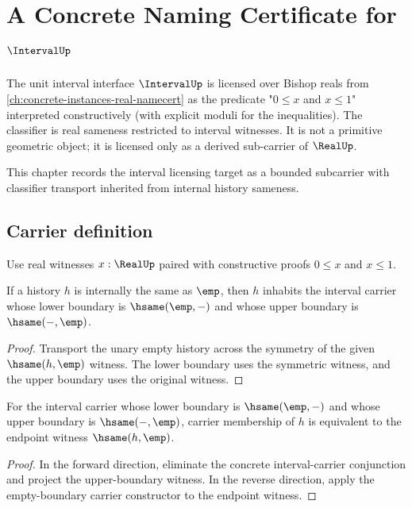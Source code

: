\chapter{A Concrete Naming Certificate for \(\IntervalUp\)}
\label{ch:concrete-instances-interval-namecert}

The unit interval interface \(\IntervalUp\) is licensed over Bishop reals from \autoref{ch:concrete-instances-real-namecert} as the predicate "\(0 \le x\) and \(x \le 1\)" interpreted constructively (with explicit moduli for the inequalities). The classifier is real sameness restricted to interval witnesses. It is not a primitive geometric object; it is licensed only as a derived sub-carrier of \(\RealUp\).

\begin{remark}
\label{rem:concrete-instances-interval-namecert-roadmap}
This chapter records the interval licensing target as a bounded subcarrier
with classifier transport inherited from internal history sameness.
\end{remark}

\section{Carrier definition}

\begin{definition}
\label{def:interval-carrier}
Use real witnesses \(x:\RealUp\) paired with constructive proofs \(0\le x\) and \(x\le1\).
\end{definition}

\begin{theorem}
\label{thm:interval-empty-boundary-of-hsame}
If a history \(h\) is internally the same as \(\emp\), then \(h\) inhabits the interval carrier whose lower boundary is \(\hsame(\emp,-)\) and whose upper boundary is \(\hsame(-,\emp)\).
\end{theorem}
\begin{proof}
Transport the unary empty history across the symmetry of the given \(\hsame(h,\emp)\) witness. The lower boundary uses the symmetric witness, and the upper boundary uses the original witness.
\end{proof}

\begin{theorem}
\label{thm:interval-empty-boundary-carrier-iff-endpoint}
For the interval carrier whose lower boundary is \(\hsame(\emp,-)\) and whose
upper boundary is \(\hsame(-,\emp)\), carrier membership of \(h\) is equivalent
to the endpoint witness \(\hsame(h,\emp)\).
\end{theorem}
\begin{proof}
In the forward direction, eliminate the concrete interval-carrier conjunction
and project the upper-boundary witness. In the reverse direction, apply the
empty-boundary carrier constructor to the endpoint witness.
\end{proof}

